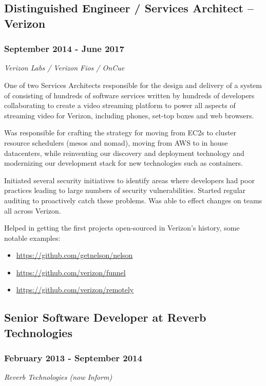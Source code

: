 \documentclass[letterpaper]{article}
\begin{document}
\subsection{Distinguished Engineer / Services Architect -- Verizon}
\label{sec-2-2}
\subsubsection{September 2014 - June 2017}
\label{sec-2-2-1}
\emph{Verizon Labs / Verizon Fios / OnCue}\\
\vspace{0.1in}

One of two Services Architects responsible for the design and delivery
of a system of consisting of hundreds of software services written by
hundreds of developers collaborating to create a video streaming
platform to power all aspects of streaming video for Verizon,
including phones, set-top boxes and  web browsers.

\vspace{0.1in}

Was responsible for crafting the strategy for moving from EC2s to
cluster resource schedulers (mesos and nomad), moving from AWS to in
house datacenters, while reinventing our discovery and deployment
technology and modernizing our development stack for new technologies
such as containers.
\vspace{0.1in}

Initiated several security initiatives to identify areas where
developers had poor practices leading to large numbers of security
vulnerabilities. Started regular auditing to proactively catch these
problems. Was able to effect changes on teams all across Verizon.
 \vspace{0.1in}

Helped in getting the first projects open-sourced in Verizon's
history, some notable examples: 
\begin{itemize}
\item \url{https://github.com/getnelson/nelson}
\item \url{https://github.com/verizon/funnel}
\item \url{https://github.com/verizon/remotely}
\end{itemize}

\subsection{Senior Software Developer at Reverb Technologies}
\label{sec-2-3}
\subsubsection{February 2013 - September 2014}
\label{sec-2-3-1}
\emph{Reverb Technologies (now Inform)}\\
\vspace{0.1in}
\end{document}
